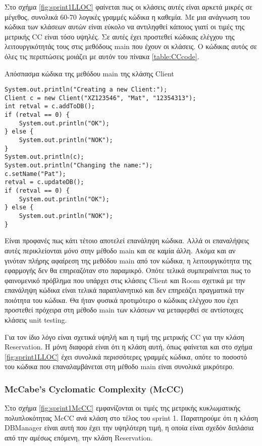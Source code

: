 Στο σχήμα \ref{fig:sprint1LLOC} φαίνεται πως οι κλάσεις αυτές είναι
αρκετά μικρές σε μέγεθος, συνολικά 60-70 λογικές γραμμές
κώδικα η καθεμία. Με μια ανάγνωση του κώδικα των κλάσεων αυτών είναι
εύκολο να αντιληφθεί κάποιος γιατί οι τιμές της μετρικής CC είναι τόσο
υψηλές. Σε αυτές έχει προστεθεί κώδικας ελέγχου της λειτουργικότητάς
τους στις μεθόδους main που έχουν οι κλάσεις. Ο κώδικας αυτός σε όλες
τις περιπτώσεις μοιάζει με αυτόν του πίνακα \ref{table:CCcode}.

\begin{table}
\caption{Απόσπασμα κώδικα της μεθόδου main της κλάσης Client}
\label{table:CCcode}
\begin{lstlisting}
System.out.println("Creating a new Client:");
Client c = new Client("XZ123546", "Mat", "12354313");
int retval = c.addToDB();
if (retval == 0) {
	System.out.println("OK");
} else {
	System.out.println("NOK");
}
System.out.println(c);
System.out.println("Changing the name:");
c.setName("Pat");
retval = c.updateDB();
if (retval == 0) {
	System.out.println("OK");
} else {
	System.out.println("NOK");
}
\end{lstlisting}
\end{table}

Είναι προφανές πως κάτι τέτοιο αποτελεί επανάληψη κώδικα. Αλλά οι επαναλήψεις
αυτές περικλείονται μόνο στην μέθοδο main και σε καμία άλλη. Ακόμα και
αν γινόταν πλήρης αφαίρεση της μεθόδου main από τον κώδικα, η
λειτουργικότητα της εφαρμογής δεν θα επηρεαζόταν στο παραμικρό. Οπότε
τελικά συμπεραίνεται πως το φαινομενικό πρόβλημα που υπάρχει στις
κλάσεις Client και Room σχετικά με την επανάληψη κώδικα είναι τελικά
παραπλανητικό και δεν επηρεάζει πραγματικά την ποιότητα του κώδικα. Θα
ήταν φυσικά προτιμότερο ο κώδικας ελέγχου που έχει προστεθεί πρόχειρα
στη μέθοδο main των κλάσεων να μεταφερθεί σε αντίστοιχες κλάσεις unit
testing.

Για τον ίδιο λόγο είναι σχετικά υψηλή και η τιμή της μετρικής CC για την
κλάση Reservation. Η μόνη διαφορά είναι ότι η κλάση αυτή, όπως φαίνεται
και στο σχήμα \ref{fig:sprint1LLOC} έχει συνολικά περισσότερες γραμμές
κώδικα, οπότε το ποσοστό του κώδικα που επαναλαμβάνεται στη μέθοδο main
είναι συνολικά μικρότερο.

\subsubsection{McCabe's Cyclomatic Complexity (McCC)}
\label{section:sprint1McCC}

Στο σχήμα \ref{fig:sprint1McCC} εμφανίζονται οι τιμές της μετρικής
κυκλωματικής πολυπλοκότητας McCC ανά κλάση στο τέλος του sprint 1.
Παρατηρούμε ότι η κλάση DBManager είναι αυτή που έχει την υψηλότερη
τιμή, η οποία είναι σχεδόν διπλάσια από την αμέσως επόμενη, την κλάση
Reservation.

